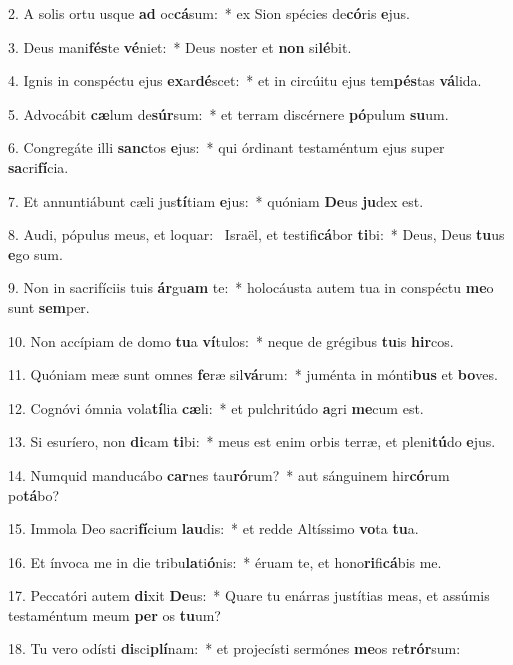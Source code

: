 2. A solis ortu usque \textbf{ad} oc\textbf{cá}sum:~*  ex Sion spécies de\textbf{có}ris \textbf{e}jus.\

3. Deus mani\textbf{fés}te \textbf{vé}niet:~*  Deus noster et \textbf{non} si\textbf{lé}bit.\

4. Ignis in conspéctu ejus \textbf{ex}ar\textbf{dé}scet:~*  et in circúitu ejus tem\textbf{pés}tas \textbf{vá}lida.\

5. Advocábit \textbf{cæ}lum de\textbf{súr}sum:~*  et terram discérnere \textbf{pó}pulum \textbf{su}um.\

6. Congregáte illi \textbf{sanc}tos \textbf{e}jus:~*  qui órdinant testaméntum ejus super \textbf{sa}cri\textbf{fí}cia.\

7. Et annuntiábunt cæli jus\textbf{tí}tiam \textbf{e}jus:~*  quóniam \textbf{De}us \textbf{ju}dex est.\

8. Audi, pópulus meus, et loquar: \dag\  Israël, et testifi\textbf{cá}bor \textbf{ti}bi:~*  Deus, Deus \textbf{tu}us \textbf{e}go sum.\

9. Non in sacrifíciis tuis \textbf{ár}gu\textbf{am} te:~*  holocáusta autem tua in conspéctu \textbf{me}o sunt \textbf{sem}per.\

10. Non accípiam de domo \textbf{tu}a \textbf{ví}tulos:~*  neque de grégibus \textbf{tu}is \textbf{hir}cos.\

11. Quóniam meæ sunt omnes \textbf{fe}ræ sil\textbf{vá}rum:~*  juménta in mónti\textbf{bus} et \textbf{bo}ves.\

12. Cognóvi ómnia vola\textbf{tí}lia \textbf{cæ}li:~*  et pulchritúdo \textbf{a}gri \textbf{me}cum est.\

13. Si esuríero, non \textbf{di}cam \textbf{ti}bi:~*  meus est enim orbis terræ, et pleni\textbf{tú}do \textbf{e}jus.\

14. Numquid manducábo \textbf{car}nes tau\textbf{ró}rum?~*  aut sánguinem hir\textbf{có}rum po\textbf{tá}bo?\

15. Immola Deo sacri\textbf{fí}cium \textbf{lau}dis:~*  et redde Altíssimo \textbf{vo}ta \textbf{tu}a.\

16. Et ínvoca me in die tribu\textbf{la}ti\textbf{ó}nis:~*  éruam te, et hono\textbf{ri}fi\textbf{cá}bis me.\

17. Peccatóri autem \textbf{di}xit \textbf{De}us:~*  Quare tu enárras justítias meas, et assúmis testaméntum meum \textbf{per} os \textbf{tu}um?\

18. Tu vero odísti \textbf{di}sci\textbf{plí}nam:~*  et projecísti sermónes \textbf{me}os re\textbf{trór}sum:\

